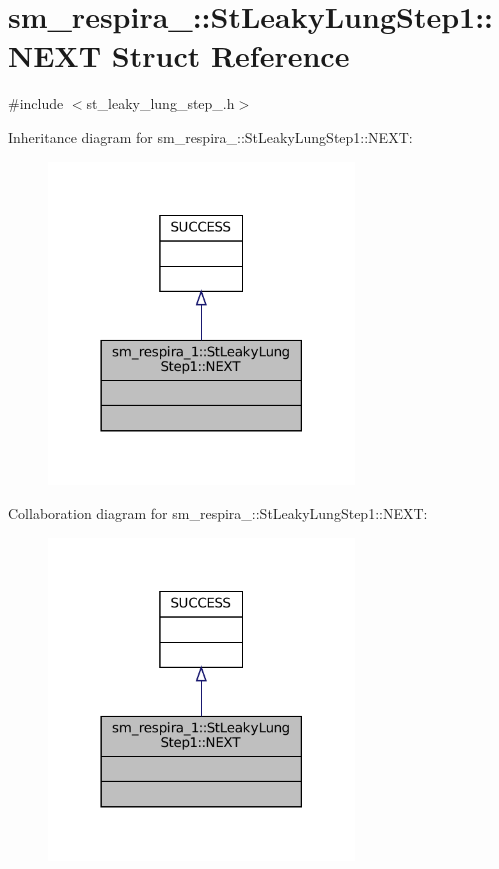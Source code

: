\hypertarget{structsm__respira__1_1_1StLeakyLungStep1_1_1NEXT}{}\section{sm\+\_\+respira\+\_\+:\+:St\+Leaky\+Lung\+Step1\+:\+:N\+E\+XT Struct Reference}
\label{structsm__respira__1_1_1StLeakyLungStep1_1_1NEXT}


{\ttfamily \#include $<$st\+\_\+leaky\+\_\+lung\+\_\+step\+\_.\+h$>$}



Inheritance diagram for sm\+\_\+respira\+\_\+:\+:St\+Leaky\+Lung\+Step1\+:\+:N\+E\+XT\+:
\nopagebreak
\begin{figure}[H]
\begin{center}
\leavevmode
\includegraphics[width=230pt]{structsm__respira__1_1_1StLeakyLungStep1_1_1NEXT__inherit__graph}
\end{center}
\end{figure}


Collaboration diagram for sm\+\_\+respira\+\_\+:\+:St\+Leaky\+Lung\+Step1\+:\+:N\+E\+XT\+:
\nopagebreak
\begin{figure}[H]
\begin{center}
\leavevmode
\includegraphics[width=230pt]{structsm__respira__1_1_1StLeakyLungStep1_1_1NEXT__coll__graph}
\end{center}
\end{figure}


